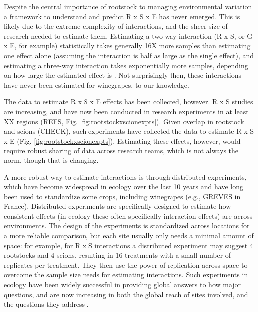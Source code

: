 \documentclass[11pt]{article}
\begin{document}
Despite the central importance of rootstock to managing environmental variation a framework to understand and predict R x S x E has never emerged. This is likely due to the extreme complexity of interactions, and the sheer size of research needed to estimate them. Estimating a two way interaction (R x S, or G x E, for example) statistically takes generally 16X more samples than estimating one effect alone (assuming the interaction is half as large as the single effect), and estimating a three-way interaction takes exponentially more samples, depending on how large the estimated effect is \citep{regotherstories}. Not surprisingly then, these interactions have never been estimated for winegrapes, to our knowledge. 

The data to estimate R x S x E effects has been collected, however. R x S studies are increasing, and have now been conducted in research experiments in at least XX regions (REFS, Fig. \ref{fig:rootstockxscionexpts}). Given overlap in rootstock and scions (CHECK), such experiments have collected the data to estimate R x S x E (Fig. \ref{fig:rootstockxscionexpts}). Estimating these effects, however, would require robust sharing of data across research teams, which is not always the norm, though that is changing. 

A more robust way to estimate interactions is through distributed experiments, which have become widespread in ecology over the last 10 years and have long been used to standardize some crops, including winegrapes (e.g., GREVES in France). Distributed experiments are specifically designed to estimate how consistent effects (in ecology these often specifically interaction effects) are across environments. The design of the experiments is standardized across locations for a more reliable comparison, but each site usually only needs a minimal amount of space: for example, for R x S interactions a distributed experiment may suggest 4 rootstocks and 4 scions, resulting in 16 treatments with a small number of replicates per treatment. They then use the power of replication across space to overcome the sample size needs for estimating interactions. Such experiments in ecology have been widely successful in providing global answers to how major questions, and are now increasing in both the global reach of sites involved, and the questions they address \citep{nutnet2014}. 
\end{document}
